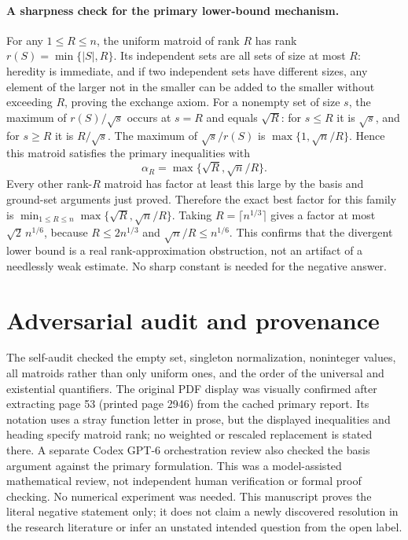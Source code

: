 \documentclass[11pt]{article}
\begin{document}
\paragraph{A sharpness check for the primary lower-bound mechanism.}
For any $1\le R\le n$, the uniform matroid of rank $R$
has rank $r(S)=\min\{|S|,R\}$. Its independent sets are all
sets of size at most $R$: heredity is immediate, and if two
independent sets have different sizes, any element of the larger
not in the smaller can be added to the smaller without exceeding
$R$, proving the exchange axiom.
For a nonempty set of size $s$, the maximum of
$r(S)/\sqrt s$ occurs at $s=R$ and equals $\sqrt R$:
for $s\le R$ it is $\sqrt s$, and for $s\ge R$ it is
$R/\sqrt s$. The maximum of $\sqrt s/r(S)$ is
$\max\{1,\sqrt n/R\}$. Hence this matroid satisfies the
primary inequalities with
\[
\alpha_R=\max\{\sqrt R,\sqrt n/R\}.
\]
Every other rank-$R$ matroid has factor at least this large by
the basis and ground-set arguments just proved. Therefore the exact
best factor for this family is
$\min_{1\le R\le n}\max\{\sqrt R,\sqrt n/R\}$.
Taking $R=\lceil n^{1/3}\rceil$ gives a factor at most
$\sqrt2\,n^{1/6}$, because $R\le2n^{1/3}$ and
$\sqrt n/R\le n^{1/6}$. This confirms that the divergent
lower bound is a real rank-approximation obstruction, not an artifact
of a needlessly weak estimate. No sharp constant is needed for
the negative answer.

\section{Adversarial audit and provenance}
The self-audit checked the empty set, singleton normalization,
noninteger values, all matroids rather than only uniform ones, and
the order of the universal and existential quantifiers. The original
PDF display was visually confirmed after extracting page 53
(printed page 2946) from the cached primary report. Its notation
uses a stray function letter in prose, but the displayed inequalities
and heading specify matroid rank; no weighted or rescaled replacement
is stated there. A separate Codex GPT-6 orchestration review also
checked the basis argument against the primary formulation. This
was a model-assisted mathematical review, not independent human
verification or formal proof checking. No numerical experiment was
needed. This manuscript proves the literal negative statement only;
it does not claim a newly discovered resolution in the research
literature or infer an unstated intended question from the open label.
\end{document}
